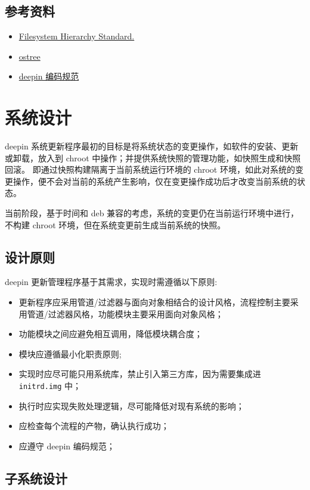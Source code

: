 \documentclass{utart}
\begin{document}
\subsection{参考资料}
\begin{itemize}[leftmargin=4em]
\item \href{https://refspecs.linuxfoundation.org/FHS\_3.0/fhs/index.html}{Filesystem Hierarchy Standard.}
\item \href{https://ostree.readthedocs.io/en/latest/}{ostree}
\item \href{https://github.com/linuxdeepin/deepin-styleguide}{deepin 编码规范}
\end{itemize}

\section{系统设计}
deepin 系统更新程序最初的目标是将系统状态的变更操作，如软件的安装、更新或卸载，放入到 chroot 中操作；并提供系统快照的管理功能，如快照生成和快照回滚。
即通过快照构建隔离于当前系统运行环境的 chroot 环境，如此对系统的变更操作，便不会对当前的系统产生影响，仅在变更操作成功后才改变当前系统的状态。

当前阶段，基于时间和 deb 兼容的考虑，系统的变更仍在当前运行环境中进行，不构建 chroot 环境，但在系统变更前生成当前系统的快照。

\subsection{设计原则}
deepin 更新管理程序基于其需求，实现时需遵循以下原则:
\begin{itemize}[leftmargin=4em]
\item 更新程序应采用管道/过滤器与面向对象相结合的设计风格，流程控制主要采用管道/过滤器风格，功能模块主要采用面向对象风格；
\item 功能模块之间应避免相互调用，降低模块耦合度；
\item 模块应遵循最小化职责原则;
\item 实现时应尽可能只用系统库，禁止引入第三方库，因为需要集成进 \texttt{initrd.img} 中；
\item 执行时应实现失败处理逻辑，尽可能降低对现有系统的影响；
\item 应检查每个流程的产物，确认执行成功；
\item 应遵守 deepin 编码规范；
\end{itemize}

\subsection{子系统设计}
\end{document}
